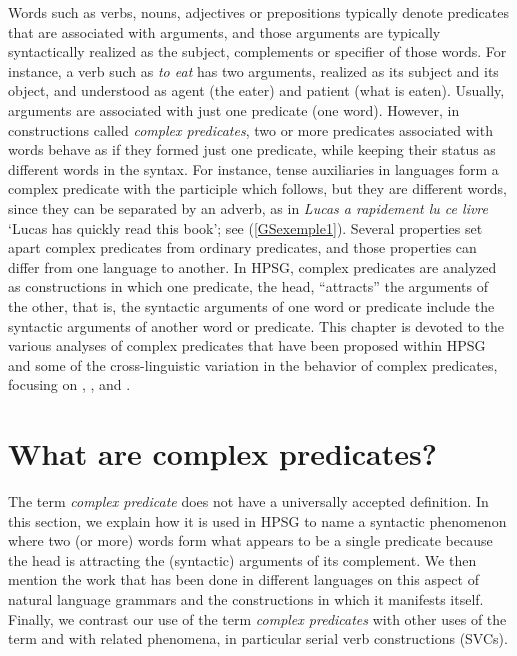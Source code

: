 Words such as verbs, nouns, adjectives or prepositions typically denote predicates that are
associated with arguments, and those arguments are typically syntactically realized as the subject,
complements or specifier of those words. For instance, a verb such as \textit{to eat} has two
arguments, realized as its subject and its object, and understood as agent (the eater) and patient
(what is eaten). Usually, arguments are associated with just one predicate (one word). However, in
constructions called \textit{complex predicates}, two or more predicates associated with words
behave as if they formed just one predicate, while keeping their status as different words in the
syntax.  For instance, tense auxiliaries in  languages form a complex predicate with
the participle which follows, but they are different words, since they can be separated by an
adverb, as in  \emph{Lucas a rapidement lu ce livre} `Lucas has quickly read this book';
see (\ref{GSexemple1}).  Several properties set apart complex predicates from ordinary predicates,
and those properties can differ from one language to another. In HPSG, complex predicates are
analyzed as constructions in which one predicate, the head, ``attracts'' the arguments of the other,
that is, the syntactic arguments of one word or predicate include the syntactic arguments of another
word or predicate. This chapter is devoted to the various analyses of complex predicates that have
been proposed within HPSG and some of the cross-linguistic variation in the behavior of complex
predicates, focusing on , ,  and .

\section{What are complex predicates?}


The term \textit{complex predicate} does not have a universally accepted definition. In this section, we explain
how it is used in HPSG to name a syntactic phenomenon where two (or more) words 
form what appears to be a single predicate because the head is attracting the (syntactic) arguments of its complement.
We then mention the work that has been done in different languages on this aspect of natural language grammars and the constructions in which it manifests itself. 
Finally, we contrast our use of the term \textit{complex predicates} with other uses of the term and
with related phenomena, in particular serial verb constructions (SVCs). 

